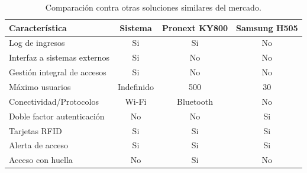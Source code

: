 \begin{table}[h]
	\centering
	\caption[Comparación soluciones]{Comparación contra otras soluciones similares del mercado.}
	\begin{tabular}{l c c c}   
		\toprule
		\textbf{Característica} & 
		\textbf{Sistema } & 
		\textbf{Pronext KY800} &	
		\textbf{Samsung H505}    
		\\
		\midrule
		Log de ingresos  & Si  & Si & No \\		
		Interfaz a sistemas externos & Si & No & No \\		
		Gestión integral de accesos & Si & No & No \\		
		Máximo usuarios & Indefinido & 500  & 30  \\		
		Conectividad/Protocolos & Wi-Fi & Bluetooth & No  \\		
		Doble factor autenticación & No  & No & Si \\
		Tarjetas RFID  & Si  & Si  & Si \\
		Alerta de acceso  & Si & Si & Si \\
		Acceso con huella & No & Si & No \\
		\bottomrule
		\hline
	\end{tabular}
	\label{tab:comparacionfinal}
\end{table}